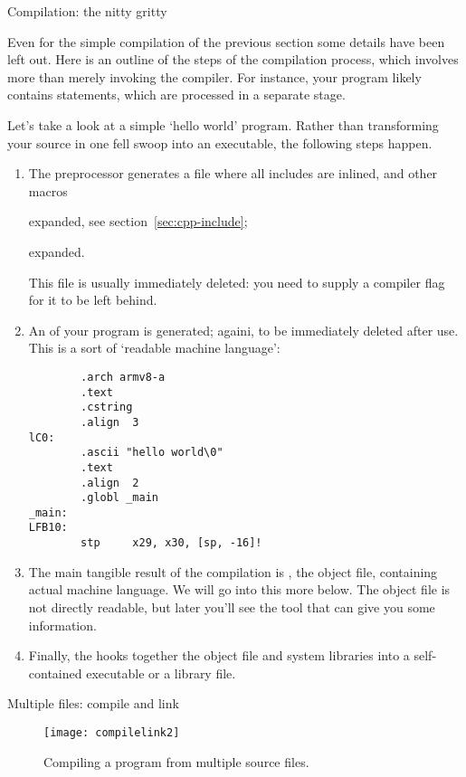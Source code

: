  {Compilation: the nitty gritty}

Even for the simple compilation of the previous section
some details have been left out.
Here is an outline of the steps of the compilation process,
which involves more than merely invoking the compiler.
For instance, your program likely contains  statements,
which are processed in a separate stage.

Let's take a look at a simple `hello world' program.
Rather than transforming your source in one fell swoop into an executable,
the following steps happen.
\begin{enumerate}
\item The preprocessor generates
  a file  where all includes are inlined,
  and other macros
\begin{packt}
  expanded, see section~\ref{sec:cpp-include};
\end{packt}
\begin{nopackt}
  expanded.
\end{nopackt}
  This file is usually immediately deleted: you need to supply
  a compiler flag for it to be left behind.
\item An   of your program
  is generated; againi, to be immediately deleted after use.
  This is a sort of `readable machine language':
\begin{lstlisting}
        .arch armv8-a
        .text
        .cstring
        .align  3
lC0:
        .ascii "hello world\0"
        .text
        .align  2
        .globl _main
_main:
LFB10:
        stp     x29, x30, [sp, -16]!    
\end{lstlisting}
\item The main tangible result of the compilation is ,
  the object file, containing actual machine language.
  We will go into this more below.
  The object file is not directly readable, but later
  you'll see the  tool that can give you some information.
\item Finally, the  hooks together the object file
  and system libraries into a self-contained executable or a library file.
\end{enumerate}

 {Multiple files: compile and link}

\begin{figure}[ht]
  \texttt{[image: compilelink2]}
  \caption{Compiling a program from multiple source files.}
  \label{fig:compilelink2}
\end{figure}

